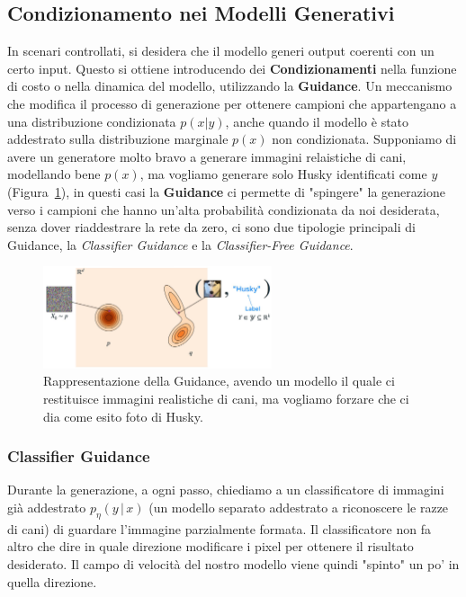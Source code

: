 \subsection{Condizionamento nei Modelli Generativi}

In scenari controllati, si desidera che il modello generi output coerenti con un certo input. Questo si ottiene introducendo dei \textbf{Condizionamenti} nella funzione di costo o nella dinamica del modello, utilizzando la \textbf{Guidance}. Un meccanismo che modifica il processo di generazione per ottenere campioni che appartengano a una distribuzione condizionata $p(x|y)$, anche quando il modello è stato addestrato sulla distribuzione marginale $p(x)$ non condizionata. Supponiamo di avere un generatore molto bravo a generare immagini relaistiche di cani, modellando bene $p(x)$, ma vogliamo generare solo Husky identificati come $y$ (Figura~\ref{fig:Guidance}), in questi casi la \textbf{Guidance} ci permette di "spingere" la generazione verso i campioni che hanno un'alta probabilità condizionata da noi desiderata, senza dover riaddestrare la rete da zero, ci sono due tipologie principali di Guidance, la \textit{Classifier Guidance} e la \textit{Classifier-Free Guidance}.

\begin{figure}
    \centering
    \includegraphics[width=0.6\textwidth]{figure/Guidance}
    \caption{Rappresentazione della Guidance, avendo un modello il quale ci restituisce immagini realistiche di cani, ma vogliamo forzare che ci dia come esito foto di Husky.}
    \label{fig:Guidance}
\end{figure}

\subsubsection{Classifier Guidance}

Durante la generazione, a ogni passo, chiediamo a un classificatore di immagini già addestrato $p_\eta(y\,|\,x)$ (un modello separato addestrato a riconoscere le razze di cani) di guardare l'immagine parzialmente formata. Il classificatore non fa altro che dire in quale direzione modificare i pixel per ottenere il risultato desiderato. Il campo di velocità del nostro modello viene quindi "spinto" un po' in quella direzione.

